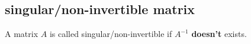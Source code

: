 \subsection{singular/non-invertible matrix}

A matrix $A$ is called singular/non-invertible if $A^{-1}$ \textbf{doesn't} exists.





